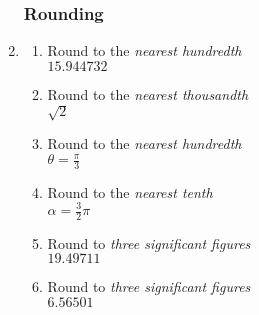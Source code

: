 \documentclass[12pt, twoside]{article}
\begin{document}
\begin{enumerate}
\subsubsection*{Rounding}
\item
  \begin{multicols}{2}
  \begin{enumerate}[itemsep=1cm]
    \item Round to the \emph{nearest hundredth} \\[0.25cm] 
    $15.944732$
    \item Round to the \emph{nearest thousandth} \\[0.25cm]
    $\sqrt{2}$
    \item Round to the \emph{nearest hundredth} \\[0.25cm]
    $\displaystyle \theta=\frac{\pi}{3}$
    \item Round to the \emph{nearest tenth} \\[0.25cm]
    $\alpha=\frac{3}{2} \pi$  
    \item Round to \emph{three significant figures} \\[0.25cm]
    $19.49711$
    \item Round to \emph{three significant figures} \\[0.25cm]
    $6.56501$

  \end{enumerate}
  \end{multicols}


\end{enumerate}
\end{document}
